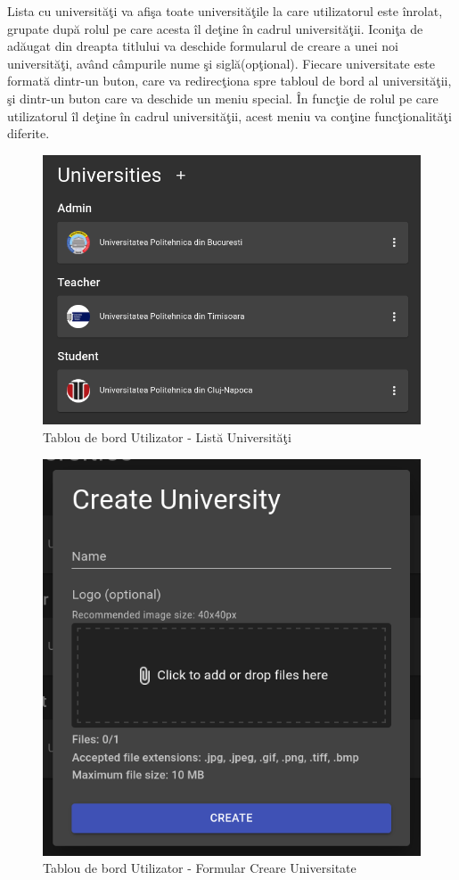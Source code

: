 \documentclass[12pt, a4paper, oneside, romanian]{teza-upb}
\begin{document}
Lista cu universităţi va afişa toate universităţile la care utilizatorul este înrolat, grupate după rolul pe care acesta îl deţine în cadrul universităţii. Iconiţa de adăugat din dreapta titlului va deschide formularul de creare a unei noi universităţi, având câmpurile nume şi siglă(opţional). Fiecare universitate este formată dintr-un buton, care va redirecţiona spre tabloul de bord al universităţii, şi dintr-un buton care va deschide un meniu special. În funcţie de rolul pe care utilizatorul îl deţine în cadrul universităţii, acest meniu va conţine funcţionalităţi diferite.

\begin{figure}[H]
\centering
\includegraphics*[width=\columnwidth]{tablou-de-bord-utilizator-lista-universitati}
\caption{Tablou de bord Utilizator - Listă Universităţi}
\label{tablou-de-bord-utilizator-lista-universitati}
\end{figure}

\begin{figure}[H]
\centering
\includegraphics*[width=0.6\columnwidth]{tablou-de-bord-utilizator-formular-creare-universitate}
\caption{Tablou de bord Utilizator - Formular Creare Universitate}
\label{tablou-de-bord-utilizator-formular-creare-universitate}
\end{figure}
\end{document}
